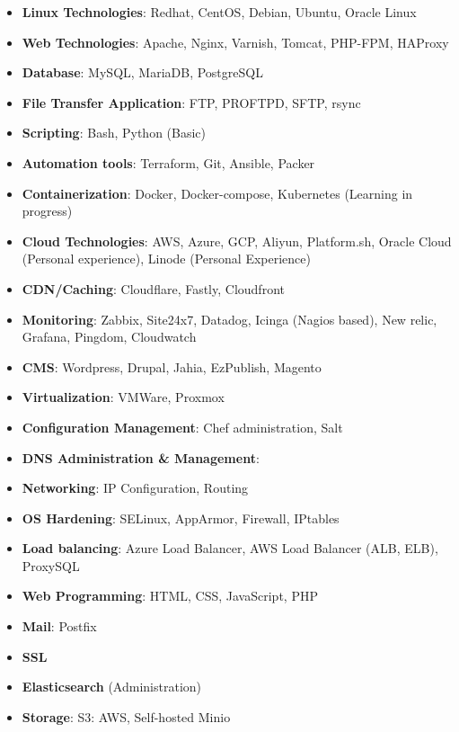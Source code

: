 \documentclass[10pt,a4paper,ragged2e,withhyper]{altacv}
\begin{document}
\begin{paracol}{2}
\divider

\switchcolumn

\newpage


\begin{itemize}[left=0pt]
    \item \textbf{\textcolor{PastelRed}{Linux Technologies}}: Redhat, CentOS, Debian, Ubuntu, Oracle Linux
    \item \textbf{\textcolor{PastelRed}{Web Technologies}}: Apache, Nginx, Varnish, Tomcat, PHP-FPM, HAProxy
    \item \textbf{\textcolor{PastelRed}{Database}}: MySQL, MariaDB, PostgreSQL
    \item \textbf{\textcolor{PastelRed}{File Transfer Application}}: FTP, PROFTPD, SFTP, rsync
    \item \textbf{\textcolor{PastelRed}{Scripting}}: Bash, Python (Basic)
    \item \textbf{\textcolor{PastelRed}{Automation tools}}: Terraform, Git, Ansible, Packer
    \item \textbf{\textcolor{PastelRed}{Containerization}}: Docker, Docker-compose, Kubernetes (Learning in progress)
    \item \textbf{\textcolor{PastelRed}{Cloud Technologies}}: AWS, Azure, GCP, Aliyun, Platform.sh, Oracle Cloud (Personal experience), Linode (Personal Experience)
    \item \textbf{\textcolor{PastelRed}{CDN/Caching}}: Cloudflare, Fastly, Cloudfront
    \item \textbf{\textcolor{PastelRed}{Monitoring}}: Zabbix, Site24x7, Datadog, Icinga (Nagios based), New relic, Grafana, Pingdom, Cloudwatch
    \item \textbf{\textcolor{PastelRed}{CMS}}: Wordpress, Drupal, Jahia, EzPublish, Magento
    \item \textbf{\textcolor{PastelRed}{Virtualization}}: VMWare, Proxmox
    \item \textbf{\textcolor{PastelRed}{Configuration Management}}: Chef administration, Salt
    \item \textbf{\textcolor{PastelRed}{DNS Administration \& Management}}: 
    \item \textbf{\textcolor{PastelRed}{Networking}}: IP Configuration, Routing
    \item \textbf{\textcolor{PastelRed}{OS Hardening}}: SELinux, AppArmor, Firewall, IPtables
    \item \textbf{\textcolor{PastelRed}{Load balancing}}: Azure Load Balancer, AWS Load Balancer (ALB, ELB), ProxySQL
    \item \textbf{\textcolor{PastelRed}{Web Programming}}: HTML, CSS, JavaScript, PHP
    \item \textbf{\textcolor{PastelRed}{Mail}}: Postfix
    \item \textbf{\textcolor{PastelRed}{SSL}}
    \item \textbf{\textcolor{PastelRed}{Elasticsearch}} (Administration)
    \item \textbf{\textcolor{PastelRed}{Storage}}: S3: AWS, Self-hosted Minio
\end{itemize}


\end{paracol}
\end{document}
